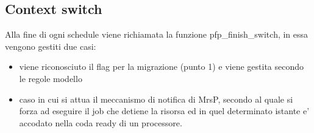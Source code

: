\documentclass[a4paper,11pt]{article}
\begin{document}
\subsection{Context switch}

\noindent Alla fine di ogni schedule viene richiamata la funzione pfp\_finish\_switch, in essa vengono gestiti due casi:

\begin{itemize}
\item viene riconosciuto il flag per la migrazione (punto 1) e viene gestita secondo le regole modello
\item caso in cui si attua il meccanismo di notifica di MrsP, secondo al quale si forza ad eseguire il job che detiene la risorsa ed in quel determinato istante e' accodato nella coda ready di un processore.
\end{itemize}
\end{document}
